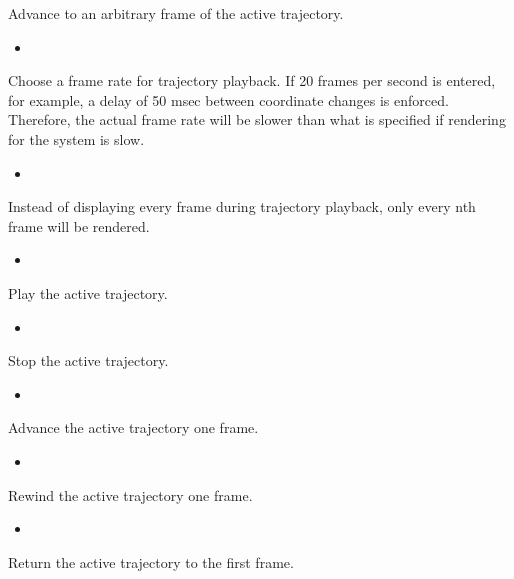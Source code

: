 \documentclass[letterpaper,11pt,english]{sphinxmanual}
\begin{document}
Advance to an arbitrary frame of the active trajectory.
\begin{itemize}
\item {} 

\end{itemize}

Choose a frame rate for trajectory playback. If 20 frames per second is entered, for example, a delay of 50 msec between coordinate changes is enforced. Therefore, the actual frame rate will be slower than what is specified if rendering for the system is slow.
\begin{itemize}
\item {} 

\end{itemize}

Instead of displaying every frame during trajectory playback, only every nth frame will be rendered.
\begin{itemize}
\item {} 

\end{itemize}

Play the active trajectory.
\begin{itemize}
\item {} 

\end{itemize}

Stop the active trajectory.
\begin{itemize}
\item {} 

\end{itemize}

Advance the active trajectory one frame.
\begin{itemize}
\item {} 

\end{itemize}

Rewind the active trajectory one frame.
\begin{itemize}
\item {} 

\end{itemize}

Return the active trajectory to the first frame.
\end{document}
